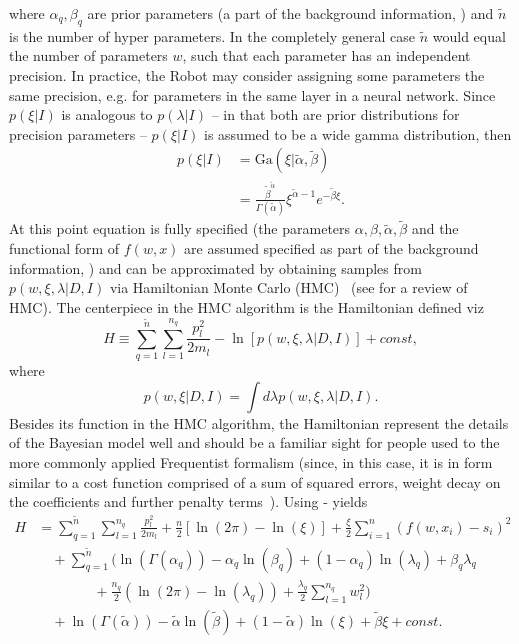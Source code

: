 where $\alpha_q,\beta_q$ are prior parameters (a part of the background information, ) and $\tilde{n}$ is the number of hyper parameters. In the completely general case $\tilde{n}$ would equal the number of parameters $w$, such that each parameter has an independent precision. In practice, the Robot may consider assigning some parameters the same precision, e.g. for parameters in the same layer in a neural network. Since $p(\xi|I)$ is analogous to $p(\lambda|I)$ -- in that both are prior distributions for precision parameters -- $p(\xi|I)$ is assumed to be a wide gamma distribution, then
\begin{equation}
	\begin{split}
		p(\xi|I) & = \text{Ga}(\xi|\tilde{\alpha},\tilde{\beta})\\
		& =\frac{\tilde{\beta}^{\tilde{\alpha}}}{\Gamma(\tilde{\alpha})}\xi^{\tilde{\alpha}-1}e^{-\tilde{\beta} \xi}.
	\end{split}
	\label{p7}
\end{equation}
At this point equation  is fully specified (the parameters $\alpha,\beta,\tilde{\alpha},\tilde{\beta}$ and the functional form of $f(w,x)$ are assumed specified as part of the background information, ) and can be approximated by obtaining samples from $p(w,\xi,\lambda|D,I)$ via Hamiltonian Monte Carlo (HMC)~\citep{Hammersley1964,Duane:1987de,Neal:1996,Neal2012} (see  for a review of HMC). The centerpiece in the HMC algorithm is the Hamiltonian defined viz~\citep{Neal:1996,Neal2012}
\begin{equation}
	H \equiv  \sum_{q=1}^{\tilde{n}}\sum_{l=1}^{n_q}\frac{p_{l}^2}{2m_{l}}-\ln[p(w,\xi,\lambda|D,I)]+const,
	\label{eqh}
\end{equation}
where 
\begin{equation}
	p(w,\xi|D,I) = \int d\lambda p(w,\xi,\lambda|D,I).
	\label{eq:ss}
\end{equation}
Besides its function in the HMC algorithm, the Hamiltonian represent the details of the Bayesian model well and should be a familiar sight for people used to the more commonly applied Frequentist formalism (since, in this case, it is in form similar to a cost function comprised of a sum of squared errors, weight decay on the coefficients and further penalty terms~\citep{hastie_09,murphy2013machine,Goodfellow2016}). Using - yields
\begin{equation}
	\begin{split}
		H&=\sum_{q=1}^{\tilde{n}}\sum_{l=1}^{n_q}\frac{p_{l}^2}{2m_{l}}+\frac{n}{2}[\ln(2\pi)-\ln(\xi)] +\frac{\xi}{2}\sum_{i=1}^{n}(f(w,x_i)-s_i)^2\\
		&\quad+\sum_{q=1}^{\tilde{n}}\bigg(\ln(\Gamma(\alpha_q))-\alpha_q\ln(\beta_q)+(1-\alpha_q)\ln(\lambda_q)+\beta_q\lambda_q\\
		&\qquad\qquad+\frac{n_q}{2}(\ln(2\pi)-\ln(\lambda_q))+\frac{\lambda_q}{2}\sum_{l=1}^{n_q}w_l^2\bigg)\\
		&\quad+\ln(\Gamma(\tilde{\alpha}))-\tilde{\alpha}\ln(\tilde{\beta})+(1-\tilde{\alpha})\ln(\xi)+\tilde{\beta}\xi+const.
	\end{split}
	\label{eqh2}
\end{equation}


